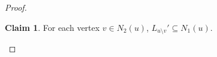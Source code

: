 \documentclass[11pt,a4paper]{article}
\theoremstyle{definition}
\newtheorem{claimthm}{Claim}[section]
\newenvironment{claimproof}
  {\renewcommand{\qedsymbol}{\ensuremath{\blacksquare}}\proof}
  {\endproof}
  {\endproof}
\begin{document}
\begin{proof}
            \begin{claimthm}\label{cla: 322}
                For each vertex $v \in N_2(u)$, $L_{u \setminus v}' \subseteq N_1(u)$.
            \end{claimthm}





\end{proof}
\end{document}
